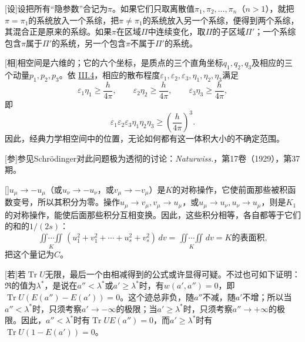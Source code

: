 \documentclass[fontsize=13pt,twoside,openany,headings=normal,parskip=false,bookmarkpackage=false,DIV=calc]{scrbook}
\begin{document}
[设]{设把所有“隐参数”合记为$\pi$。如果它们只取离散值$\pi_1,\allowbreak \pi_2,\allowbreak \ldots,\allowbreak \pi_n$（$n>1$），就把$\pi=\pi_1$的系统放入一个系综，把$\pi\ne\pi_1$的系统放入另一个系综，便得到两个系综，其混合正是原来的系综。如果$\pi$在区域$\Pi$中连续变化，取$\Pi$的子区域$\Pi'$；一个系综包含$\pi$属于$\Pi'$的系统，另一个包含$\pi$不属于$\Pi'$的系统。}

[相]{相空间是六维的；它的六个坐标，是质点的三个直角坐标$q_1,\allowbreak q_2,\allowbreak q_3$及相应的三个动量$p_1,\allowbreak p_2,\allowbreak p_3$。依 \hyperref[sec:III.4]{III.4}，相应的散布程度$\varepsilon_1,\allowbreak \varepsilon_2,\allowbreak \varepsilon_3,\allowbreak \eta_1,\allowbreak \eta_2,\allowbreak \eta_3$满足
\[
\varepsilon_1\eta_1\ge\frac h{4\pi},\qquad
\varepsilon_2\eta_2\ge\frac h{4\pi},\qquad
\varepsilon_3\eta_3\ge\frac h{4\pi},
\]
即
\[
\varepsilon_1\varepsilon_2\varepsilon_3\eta_1\eta_2\eta_3\ge\left(\frac h{4\pi}\right)^3.
\]
因此，经典力学相空间中的位置，无论如何都有这一体积大小的不确定范围。}

[参]{参见Schrödinger对此问题极为透彻的讨论：\emph{Naturwiss.}，第17卷（1929），第37期。}

[]{$u_\mu\to-u_\mu$（或$u_\nu\to-u_\nu$，或$v_\mu\to-v_\mu$）是$K$的对称操作，它使前面那些被积函数变号，所以其积分为零。操作$u_\mu\to v_\mu,\allowbreak v_\mu\to u_\mu$，或$u_\mu\to u_\nu,\allowbreak u_\nu\to u_\mu$，则是$K_1$的对称操作，能使后面那些积分互相变换。因此，这些积分相等，各自都等于它们的和的$1/(2s)$：
\[
\mathop{\iint\cdots\iint}\limits_K(u_1^2+v_1^2+\cdots+u_s^2+v_s^2)\,dv
=\mathop{\iint\cdots\iint}\limits_Kdv=\text{$K$的表面积},
\]
把这个量记为$C$。}

[若]{若$\operatorname{Tr}U$无限，最后一个由相减得到的公式或许显得可疑。不过也可如下证明：$\mathfrak R$的值为$\lambda^*$，是说在$a''<\lambda^*$或$a'\ge\lambda^*$时，有$w(a',\allowbreak a'')=0$，即$\operatorname{Tr}U(E(a'')-E(a'))=0$。这个迹总非负，随$a''$不减，随$a'$不增；所以当$a''<\lambda^*$时，只须考察$a'\to-\infty$的极限；当$a'\ge\lambda^*$时，只须考察$a''\to+\infty$的极限。因此，$a''<\lambda^*$时有$\operatorname{Tr}UE(a'')=0$，而$a'\ge\lambda^*$时有$\operatorname{Tr}U(1-E(a'))=0$。}
\end{document}
